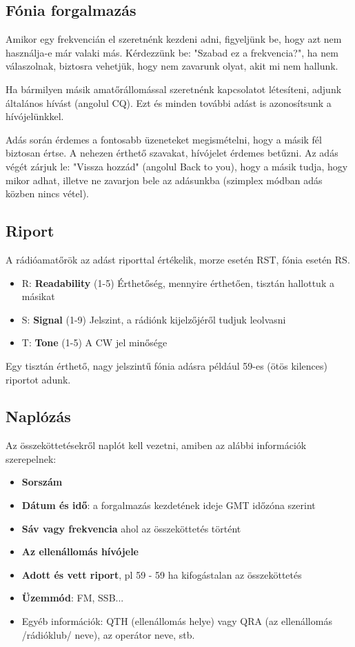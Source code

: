 \documentclass[12pt,a4paper]{article}
\begin{document}
\subsection{Fónia forgalmazás}

Amikor egy frekvencián el szeretnénk kezdeni adni, figyeljünk be, hogy azt nem használja-e már valaki más. Kérdezzünk be: "Szabad ez a frekvencia?", ha nem válaszolnak, biztosra vehetjük, hogy nem zavarunk olyat, akit mi nem hallunk.

Ha bármilyen másik amatőrállomással szeretnénk kapcsolatot létesíteni, adjunk általános hívást (angolul CQ). Ezt és minden további adást is azonosítsunk a hívójelünkkel.

Adás során érdemes a fontosabb üzeneteket megismételni, hogy a másik fél biztosan értse. A nehezen érthető szavakat, hívójelet érdemes betűzni. Az adás végét zárjuk le: "Vissza hozzád" (angolul Back to you), hogy a másik tudja, hogy mikor adhat, illetve ne zavarjon bele az adásunkba (szimplex módban adás közben nincs vétel).

\subsection{Riport}

A rádióamatőrök az adást riporttal értékelik, morze esetén RST, fónia esetén RS.

\begin{itemize}
\item R: \textbf{Readability} (1-5) Érthetőség, mennyire érthetően, tisztán hallottuk a másikat
\item S: \textbf{Signal} (1-9) Jelszint, a rádiónk kijelzőjéről tudjuk leolvasni
\item T: \textbf{Tone} (1-5) A CW jel minősége
\end{itemize}

Egy tisztán érthető, nagy jelszintű fónia adásra például 59-es (ötös kilences) riportot adunk.

\subsection{Naplózás}

Az összeköttetésekről naplót kell vezetni, amiben az alábbi információk szerepelnek:
\begin{itemize}
\item \textbf{Sorszám}
\item \textbf{Dátum és idő}: a forgalmazás kezdetének ideje GMT időzóna szerint
\item \textbf{Sáv vagy frekvencia} ahol az összeköttetés történt
\item \textbf{Az ellenállomás hívójele}
\item \textbf{Adott és vett riport}, pl 59 - 59 ha kifogástalan az összeköttetés
\item \textbf{Üzemmód}: FM, SSB...
\item Egyéb információk: QTH (ellenállomás helye) vagy QRA (az ellenállomás /rádióklub/ neve), az operátor neve, stb.
\end{itemize}
\end{document}
